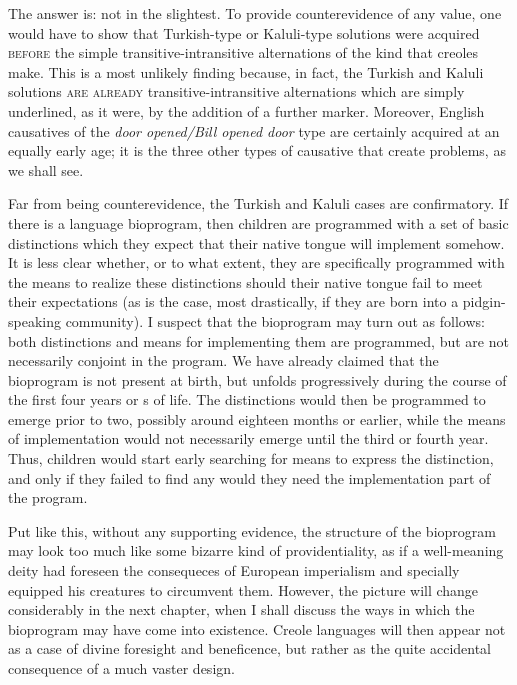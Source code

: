 The answer is: not in the slightest. To provide counterevidence of any value, one would have to show that Turkish-type or Kaluli-type solutions were acquired \textsc{before} the simple transitive-intransitive alternations of the kind that creoles make. This is a most unlikely finding because, in fact, the Turkish and Kaluli solutions \textsc{are already} transitive-intransitive alternations which are simply under\-lined, as it were, by the addition of a further marker. Moreover, English causatives of the \textit{door opened/Bill opened door} type are certainly acquired at an equally early age; it is the three other types of causative that create problems, as we shall see.

Far from being counterevidence, the Turkish and Kaluli cases are confirmatory. If there is a language bioprogram, then children are programmed with a set of basic distinctions which they expect that their native tongue will implement somehow. It is less clear whether, or to what extent, they are specifically programmed with the means to realize these distinctions should their native tongue fail to meet their expectations (as is the case, most drastically, if they are born into a pidgin-speaking community). I suspect that the bioprogram may turn out as follows: both distinctions and means for implementing them are programmed, but are not necessarily conjoint in the program. We have already claimed that the bioprogram is not present at birth, but unfolds progressively during the course of the first four years or s of life. The distinctions would then be programmed to emerge prior to two, possibly around eighteen months or earlier, while the means of implementation would not necessarily emerge until the third or fourth year. Thus, children would start early searching for means to express the distinction, and only if they failed to find any
would they need the implementation part of the program.

Put like this, without any supporting evidence, the structure of the bioprogram may look too much like some bizarre kind of providentiality, as if a well-meaning deity had foreseen the consequeces of European imperialism and specially equipped his creatures to circum\-vent them. However, the picture will change considerably in the next chapter, when I shall discuss the ways in which the bioprogram may have come into existence. Creole languages will then appear not as a case of divine foresight and beneficence, but rather as the quite acci\-dental consequence of a much vaster design.

